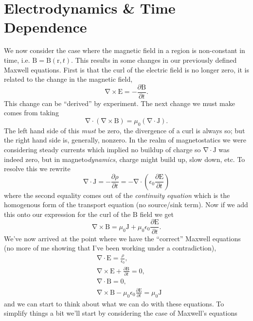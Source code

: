 \documentclass[10pt, twocolumn]{article}
\theoremstyle{definition}
\newcommand{\bv}[1]{\bm{\mathrm{#1}}}
\begin{document}
\section{Electrodynamics \& Time Dependence}
We now consider the case where the magnetic field in a region is non-constant in time, i.e. $\bv{B}=\bv{B}(\bv{r},t)$.
This results in some changes in our previously defined Maxwell equations. First is that the curl of the electric field is no longer
zero, it is related to the change in the magnetic field,
$$\bv{\nabla}\times \bv{E}=-\frac{\partial \bv{B}}{\partial t}.$$
This change can be ``derived'' by experiment. The next change we must make comes from taking
$$\bv{\nabla}\cdot(\bv{\nabla}\times \bv{B})=\mu_0(\bv{\nabla}\cdot \bv{J}).$$
The left hand side of this \emph{must} be zero, the divergence of a curl is always so; but the right hand side is, generally, nonzero.
In the realm of magnetostatics we were considering steady currents which implied no buildup of charge so $\bv{\nabla}\cdot \bv{J}$ was
indeed zero, but in magneto\emph{dynamics}, charge might build up, slow down, etc. To resolve this we rewrite
$$\bv{\nabla}\cdot \bv{J}=-\frac{\partial \rho}{\partial t}=-\bv{\nabla}\cdot\left(\epsilon_0\frac{\partial \bv{E}}{\partial t}\right)$$
where the second equality comes out of the \emph{continuity equation} which is the homogenous form of the transport equation (no source/sink term). Now if we add this onto our expression for the curl of the
$\bv{B}$ field we get
\begin{equation}
  \bv{\nabla}\times \bv{B}=\mu_0\bv{J}+\mu_0\epsilon_0\frac{\partial \bv{E}}{\partial t}.
\end{equation}
We've now arrived at the point where we have the ``correct'' Maxwell equations (no more of me showing that I've been working under a contradiction),
\begin{align*}
   & \bv{\nabla}\cdot \bv{E}                                                     =\frac{\rho}{\epsilon_0}, \\
   & \bv{\nabla}\times \bv{E}+\frac{\partial \bv{B}}{\partial t}                 =\bv{0},                  \\
   & \bv{\nabla}\cdot \bv{B}                                                     =0,                       \\
   & \bv{\nabla}\times \bv{B}-\mu_0\epsilon_0\frac{\partial \bv{E}}{\partial t}  =\mu_0\bv{J}
\end{align*}
and we can start to think about what we can do with these equations. To simplify things a bit we'll start by considering the case of Maxwell's equations
\end{document}
